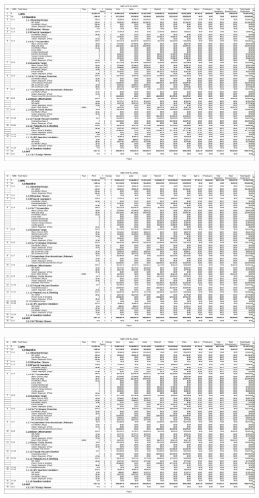 \begin{center}
\includegraphics[page=6,angle=90,height=\textheight]{cost_schedule/HPSV470.pdf} 
\end{center}

\begin{center}
\includegraphics[page=7,angle=90,height=\textheight]{cost_schedule/HPSV470.pdf} 
\end{center}

\begin{center}
\includegraphics[page=8,angle=90,height=\textheight]{cost_schedule/HPSV470.pdf} 
\end{center}

